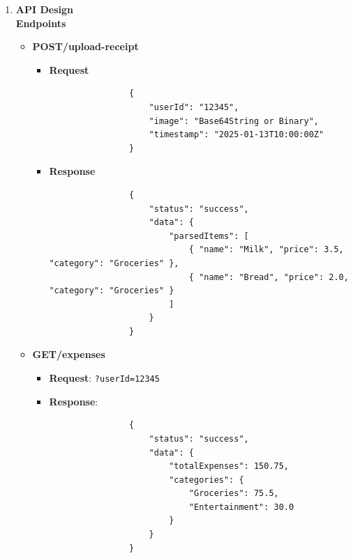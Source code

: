 \documentclass[12pt, titlepage]{article}
\begin{document}
\begin{enumerate}
\begin{itemize}
\begin{itemize}
\begin{itemize}
			\end{itemize}
			\item \textbf{Back End}:
			\begin{itemize}
				\item Queries the database for budget/expense data.
				\item Updates user budgets based on inputs.
				\item Runs predictive models for forecasting.
			\end{itemize}
			\item \textbf{Response}:
			\begin{itemize}
				\item Sends updated data or predictions to the front end.
			\end{itemize}
		\end{itemize}
	\end{itemize}
	\newpage
	\item \textbf{API Design}
	\\ \textbf{Endpoints}
	\begin{itemize}
		\item \textbf{POST/upload-receipt}
		\begin{itemize}
			\item \textbf{Request}
			\begin{verbatim}
				{
					"userId": "12345",
					"image": "Base64String or Binary",
					"timestamp": "2025-01-13T10:00:00Z"
				}
			\end{verbatim}
			\item \textbf{Response}
			\begin{verbatim}
				{
					"status": "success",
					"data": {
						"parsedItems": [
							{ "name": "Milk", "price": 3.5, "category": "Groceries" },
							{ "name": "Bread", "price": 2.0, "category": "Groceries" }
						]
					}
				}
			\end{verbatim}
		\end{itemize}
		\item \textbf{GET/expenses}
		\begin{itemize}
			\item \textbf{Request}: \texttt{?userId=12345}
			\item \textbf{Response}:
			\begin{verbatim}
				{
					"status": "success",
					"data": {
						"totalExpenses": 150.75,
						"categories": {
							"Groceries": 75.5,
							"Entertainment": 30.0
						}
					}
				}
			\end{verbatim}
		\end{itemize}

\end{itemize}
\end{enumerate}
\end{document}
